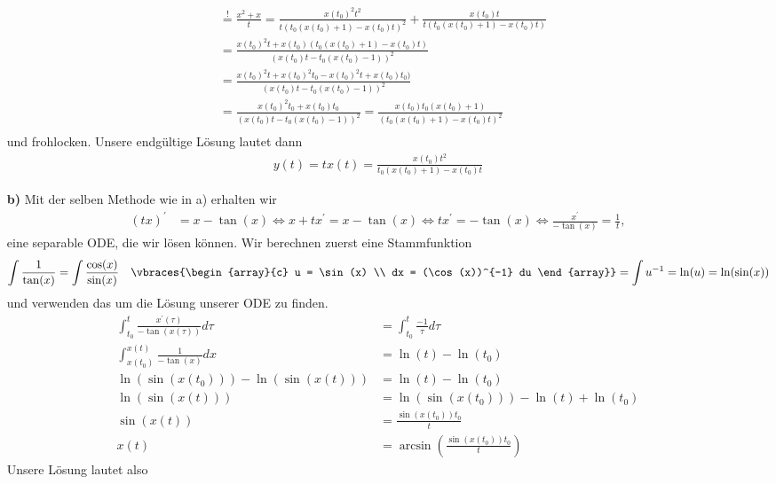 \begin{solution}
\begin{itemize}
\begin{align*}
    &\stackrel{!}{=} \frac{x^2 + x}{t}
    = \frac{x(t_0)^2t^2}{t(t_0(x(t_0) + 1) - x(t_0)t)^2} + \frac{x(t_0)t}{t(t_0(x(t_0) + 1) - x(t_0)t)} \\
    &= \frac{x(t_0)^2t + x(t_0)(t_0(x(t_0) + 1) - x(t_0)t)}{(x(t_0)t - t_0(x(t_0) - 1))^2}\\
    &= \frac{x(t_0)^2t + x(t_0)^2t_0 - x(t_0)^2t + x(t_0)t_0)}{(x(t_0)t - t_0(x(t_0) - 1))^2}\\
    &= \frac{x(t_0)^2t_0 + x(t_0)t_0}{(x(t_0)t - t_0(x(t_0) - 1))^2}
    = \frac{x(t_0)t_0(x(t_0) + 1)}{(t_0(x(t_0) + 1) - x(t_0)t)^2}\\
  \end{align*}
  und frohlocken.
  Unsere endgültige Lösung lautet dann
  \begin{align*}
    y(t) = tx(t) = \frac{x(t_0)t^2}{t_0(x(t_0) + 1) - x(t_0)t}
  \end{align*}
  \item [\textbf{b)}]
  Mit der selben Methode wie in a) erhalten wir
  \begin{align*}
    (tx)^{\prime} &= x - \tan(x) \iff x + tx^\prime = x - \tan(x) \iff tx^\prime = -\tan(x) \iff \frac{x^{\prime}}{-\tan(x)} = \frac{1}{t},
  \end{align*}
  eine separable ODE, die wir lösen können.
  Wir berechnen zuerst eine Stammfunktion
  \begin{align*}
    \int \frac{1}{\tan(x)} = \int \frac{\cos(x)}{\sin(x)} \quad \vbraces{\begin{array}{c} u = \sin(x) \\ dx = (\cos(x))^{-1} du \end{array}} = \int u^{-1} = \ln(u) = \ln(\sin(x))
  \end{align*}
  und verwenden das um die Lösung unserer ODE zu finden.
  \begin{align*}
    \int_{t_0}^t \frac{x^{\prime}(\tau)}{-\tan(x(\tau))}d\tau &= \int_{t_0}^t \frac{-1}{\tau}d\tau \\
    \int_{x(t_0)}^{x(t)} \frac{1}{-\tan(x)}dx &= \ln(t) - \ln(t_0) \\
    \ln(\sin(x(t_0))) - \ln(\sin(x(t))) &= \ln(t) - \ln(t_0) \\
    \ln(\sin(x(t))) &= \ln(\sin(x(t_0))) - \ln(t) + \ln(t_0) \\
    \sin(x(t)) &= \frac{\sin(x(t_0))t_0}{t} \\
    x(t) &= \arcsin\left(\frac{\sin(x(t_0))t_0}{t}\right)
  \end{align*}
  Unsere Lösung lautet also
  \begin{align*}

\end{align*}
\end{itemize}
\end{solution}
